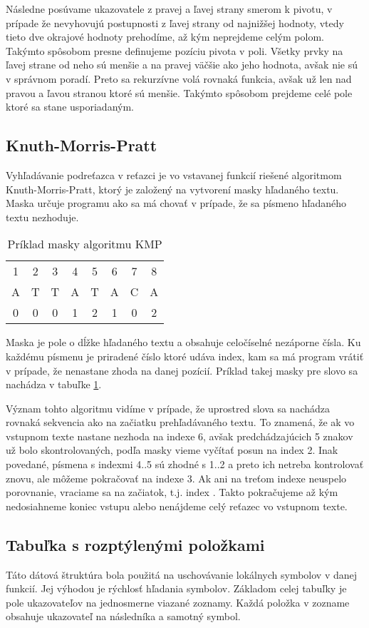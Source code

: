 \documentclass[12pt,a4paper,titlepage,final]{article}
\begin{document}
Následne posúvame ukazovatele  z pravej a ľavej strany smerom k pivotu,
 v prípade že nevyhovujú postupnosti z ľavej strany od najnižšej hodnoty, 
 vtedy tieto dve okrajové hodnoty prehodíme, až kým neprejdeme celým polom.
Takýmto spôsobom presne definujeme pozíciu pivota v poli. Všetky prvky na ľavej
 strane od neho sú menšie a na pravej väčšie ako jeho hodnota, avšak nie sú
 v správnom poradí. Preto sa rekurzívne volá rovnaká funkcia, avšak už len nad
 pravou a ľavou stranou ktoré sú menšie. Takýmto spôsobom prejdeme celé pole
 ktoré sa stane usporiadaným.

\subsection{Knuth-Morris-Pratt}
Vyhľadávanie podreťazca v reťazci je vo vstavanej funkcií riešené algoritmom
 Knuth-Morris-Pratt, ktorý je založený na vytvorení masky hľadaného textu.
Maska určuje programu ako sa má chovať v prípade, že sa písmeno hľadaného
 textu nezhoduje.
\begin{table}[H]
 \centering
 \begin{tabular}{cccccccc}
 	1 & 2 & 3 & 4 & 5 & 6 & 7 & 8 \\
 	A & T & T & A & T & A & C & A \\
 	0 & 0 & 0 & 1 & 2 & 1 & 0 & 2
 \end{tabular}
 \caption{Príklad masky algoritmu KMP}
 \label{tab:kmp}
\end{table}

Maska je pole o dĺžke hľadaného textu a obsahuje celočíselné nezáporne čísla.
Ku každému písmenu je priradené číslo ktoré udáva index, kam sa má program
 vrátiť v prípade, že nenastane zhoda na danej pozícií. Príklad takej masky
 pre slovo  sa nachádza v tabuľke \ref{tab:kmp}.

Význam tohto algoritmu vidíme v prípade, že uprostred slova sa nachádza
 rovnaká sekvencia ako na začiatku prehľadávaného textu.
To znamená, že ak vo vstupnom texte nastane nezhoda na indexe 6, avšak
 predchádzajúcich 5 znakov už bolo skontrolovaných, podľa masky vieme vyčítať
 posun na index 2. Inak povedané, písmena s indexmi 4..5 sú zhodné s 1..2
 a preto ich netreba kontrolovať znovu, ale môžeme pokračovať na indexe 3.
Ak ani na treťom indexe neuspelo porovnanie, vraciame sa na začiatok, t.j.
index . Takto pokračujeme až kým nedosiahneme koniec vstupu alebo
nenájdeme celý reťazec vo vstupnom texte.

\subsection{Tabuľka s rozptýlenými položkami}
Táto dátová štruktúra bola použitá na uschovávanie lokálnych symbolov v danej
 funkcií. Jej výhodou je rýchlosť hľadania symbolov. 
Základom celej tabuľky je pole ukazovateľov na jednosmerne viazané zoznamy.
Každá položka v zozname obsahuje ukazovateľ na následníka a samotný symbol.
\end{document}
